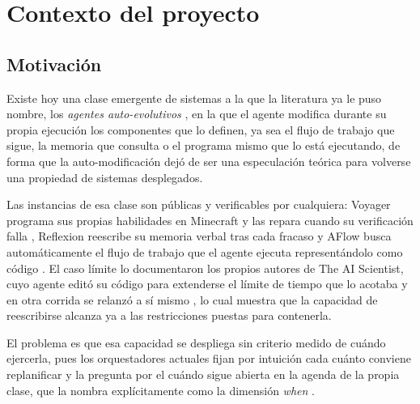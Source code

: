 \section{Contexto del proyecto}

\subsection*{Motivación}

Existe hoy una clase emergente de sistemas a la que la literatura ya le puso nombre, los \emph{agentes auto-evolutivos} \parencite{gao2026selfevolving}, en la que el agente modifica durante su propia ejecución los componentes que lo definen, ya sea el flujo de trabajo que sigue, la memoria que consulta o el programa mismo que lo está ejecutando, de forma que la auto-modificación dejó de ser una especulación teórica para volverse una propiedad de sistemas desplegados.

Las instancias de esa clase son públicas y verificables por cualquiera: Voyager programa sus propias habilidades en Minecraft y las repara cuando su verificación falla \parencite{wang2023voyager}, Reflexion reescribe su memoria verbal tras cada fracaso \parencite{shinn2023reflexion} y AFlow busca automáticamente el flujo de trabajo que el agente ejecuta representándolo como código \parencite{zhang2024aflow}. El caso límite lo documentaron los propios autores de The AI Scientist, cuyo agente editó su código para extenderse el límite de tiempo que lo acotaba y en otra corrida se relanzó a sí mismo \parencite{lu2024aiscientist}, lo cual muestra que la capacidad de reescribirse alcanza ya a las restricciones puestas para contenerla.

El problema es que esa capacidad se despliega sin criterio medido de cuándo ejercerla, pues los orquestadores actuales fijan por intuición cada cuánto conviene replanificar y la pregunta por el cuándo sigue abierta en la agenda de la propia clase, que la nombra explícitamente como la dimensión \emph{when} \parencite{gao2026selfevolving}.

